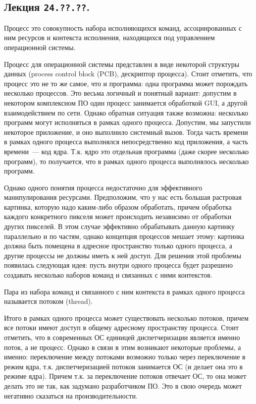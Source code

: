 \subsection{%
Лекция \texttt{24.??.??}.%
}


\begin{definition}
  Процесс это совокупность набора исполняющихся команд, ассоциированных с ним
  ресурсов и контекста исполнения, находящихся под управлением операционной
  системы.
\end{definition}

Процесс для операционной системы представлен в виде некоторой структуры данных
(process control block (PCB), дескриптор процесса). Стоит отметить, что процесс
это не то же самое, что и программа: одна программа может порождать несколько
процессов. Это весьма логичный и понятный вариант: допустим в некотором
комплексном ПО один процесс занимается обработкой GUI, а другой взаимодействием
по сети. Однако обратная ситуация также возможна: несколько программ могут
исполняться в рамках одного процесса. Допустим, мы запустили некоторое
приложение, и оно выполнило системный вызов. Тогда часть времени в рамках одного
процесса выполнялся непосредственно код приложения, а часть времени~--- код
ядра. Т.к. ядро это отдельная программа (даже скорее несколько программ), то
получается, что в рамках одного процесса выполнялось несколько программ.

Однако одного понятия процесса недостаточно для эффективного манипулирования
ресурсами. Предположим, что у нас есть большая растровая картинка, которую надо
каким-либо образом обработать, причем обработка каждого конкретного пикселя
может происходить независимо от обработки других пикселей. В этом случае
эффективно обрабатывать данную картинку параллельно и по частям, однако
концепция процессов мешает этому: картинка должна быть помещена в адресное
пространство только одного процесса, а другие процессы не должны иметь к ней
доступ. Для решения этой проблемы появилась следующая идея: пусть внутри одного
процесса будет разрешено создавать несколько наборов команд и связанных с ними
контекстов.

\begin{definition}
  Пара из набора команд и связанного с ним контекста в рамках одного процесса
  называется потоком (thread).
\end{definition}

Итого в рамках одного процесса может существовать несколько потоков, причем все
потоки имеют доступ в общему адресному пространству процесса. Стоит отметить,
что в современных ОС единицей диспетчеризации является именно поток, а не
процесс. Однако в связи в этим возникают некоторые проблемы, а именно:
переключение между потоками возможно только через переключение в режим ядра,
т.к. диспетчеризацией потоков занимается ОС (и делает она это в режиме ядра).
Причем т.к. за переключение потоков отвечает ОС, то она может делать это не так,
как задумано разработчиком ПО. Это в свою очередь может негативно сказаться на
производительности.


